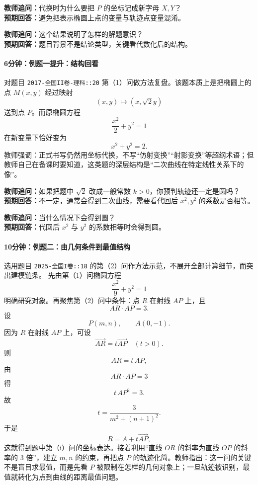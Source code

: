 \documentclass[UTF8,a4paper,11pt]{ctexart}
\begin{document}
\noindent\textbf{教师追问：}代换时为什么要把 $P$ 的坐标记成新字母 $X,Y$？\\

\textbf{预期回答：}避免把表示椭圆上点的变量与轨迹点变量混淆。\par

\noindent\textbf{教师追问：}这个结果说明了怎样的解题意识？\\

\textbf{预期回答：}题目背景不是结论类型，关键看代数化后的结构。\par

\paragraph{6分钟：例题一提升：结构回看}

对题目 \texttt{2017-全国II卷-理科::20} 第（1）问做方法复盘。该题本质上是把椭圆上的点 $M(x,y)$ 经过映射
\[
(x,y)\mapsto (x,\sqrt{2}y)
\]
送到点 $P$。而原椭圆方程
\[
\frac{x^2}{2}+y^2=1
\]
在新变量下恰好变为
\[
x^2+y^2=2.
\]
教师强调：正式书写仍然用坐标代换，不写“仿射变换”“射影变换”等超纲术语；但教师自己在备课时要知道，这类题的深层结构是“二次曲线在特定线性关系下的像”。

\noindent\textbf{教师追问：}如果把题中 $\sqrt{2}$ 改成一般常数 $k>0$，你预判轨迹还一定是圆吗？\\

\textbf{预期回答：}不一定，通常会得到二次曲线，需要看代回后 $x^2,y^2$ 的系数是否相等。\par

\noindent\textbf{教师追问：}当什么情况下会得到圆？\\

\textbf{预期回答：}代回后 $x^2$ 与 $y^2$ 的系数相等时会得到圆。\par

\paragraph{10分钟：例题二：由几何条件到最值结构}

选用题目 \texttt{2025-全国I卷::18} 的第（2）问作方法示范，不展开全部计算细节，而突出建模链条。
先由第（1）问椭圆方程
\[
\frac{x^2}{9}+y^2=1
\]
明确研究对象。再聚焦第（2）问中条件：点 $R$ 在射线 $AP$ 上，且
\[
AR\cdot AP=3.
\]
设
\[
P(m,n),\qquad A(0,-1).
\]
因为 $R$ 在射线 $AP$ 上，可设
\[
\overrightarrow{AR}=t\overrightarrow{AP}\quad (t>0).
\]
则
\[
AR=t\,AP,
\]
由
\[
AR\cdot AP=3
\]
得
\[
t\,AP^2=3.
\]
故
\[
t=\frac{3}{m^2+(n+1)^2}.
\]
于是
\[
R=A+t\overrightarrow{AP},
\]
这就得到题中第（i）问的坐标表达。接着利用“直线 $OR$ 的斜率为直线 $OP$ 的斜率的 $3$ 倍”，建立 $m,n$ 的约束，再把点 $P$ 的轨迹化简。教师指出：这一问的关键不是盲目求最值，而是先看 $P$ 被限制在怎样的几何对象上；一旦轨迹被识别，最值就转化为点到曲线的距离最值问题。
\end{document}
